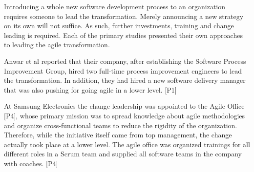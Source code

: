 Introducing a whole new software development process to an organization
requires someone to lead the transformation. Merely announcing a new
strategy on its own will not suffice. As such, further investments,
training and change leading is required. Each of the primary studies
presented their own approaches to leading the agile transformation.

Anwar et al reported that their company, after establishing the Software
Process Improvement Group, hired two full-time process improvement
engineers to lead the transformation. In addition, they had hired a new
software delivery manager that was also pushing for going agile in a
lower level. [P1]

At Samsung Electronics the change leadership was appointed to the Agile
Office [P4], whose primary mission was to spread knowledge about agile
methodologies and organize cross-functional teams to reduce the rigidity
of the organization. Therefore, while the initiative itself came from
top management, the change actually took place at a lower level. The
agile office was organized trainings for all different roles in a Scrum
team and supplied all software teams in the company with coaches. [P4]
